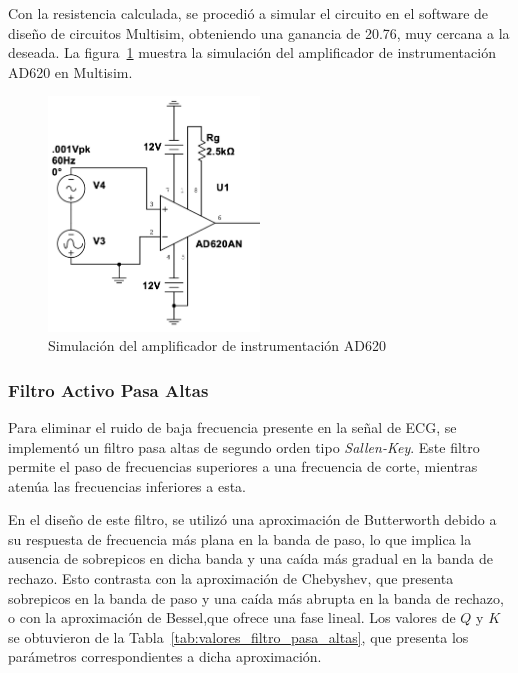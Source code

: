             Con la resistencia calculada, se procedió a simular el circuito en el software de diseño de circuitos Multisim, obteniendo una ganancia de 20.76, muy cercana a la deseada. La figura~\ref{fig:Simulacion_AD620} muestra la simulación del amplificador de instrumentación AD620 en Multisim.

            \begin{figure}[H]
                \centering
                \includegraphics[width=0.5\textwidth]{img/Desarrollo/multisim_AD620AN.png}
                \caption[Simulación del amplificador de instrumentación AD620.]{Simulación del amplificador de instrumentación AD620\footnotemark}
                \label{fig:Simulacion_AD620}
            \end{figure}

        \subsubsection{Filtro Activo Pasa Altas}
            Para eliminar el ruido de baja frecuencia presente en la señal de ECG, se implementó un filtro pasa altas de segundo orden tipo \textit{Sallen-Key}. Este filtro permite el paso de frecuencias superiores a una frecuencia de corte, mientras atenúa las frecuencias inferiores a esta.

            En el diseño de este filtro, se utilizó una aproximación de Butterworth debido a su respuesta de frecuencia más plana en la banda de paso, lo que implica la ausencia de sobrepicos en dicha banda y una caída más gradual en la banda de rechazo. Esto contrasta con la aproximación de Chebyshev, que presenta sobrepicos en la banda de paso y una caída más abrupta en la banda de rechazo, o con la aproximación de Bessel,que  ofrece una fase lineal. Los valores de $Q$ y $K$ se obtuvieron de la Tabla~\ref{tab:valores_filtro_pasa_altas}, que presenta los parámetros correspondientes a dicha aproximación.

